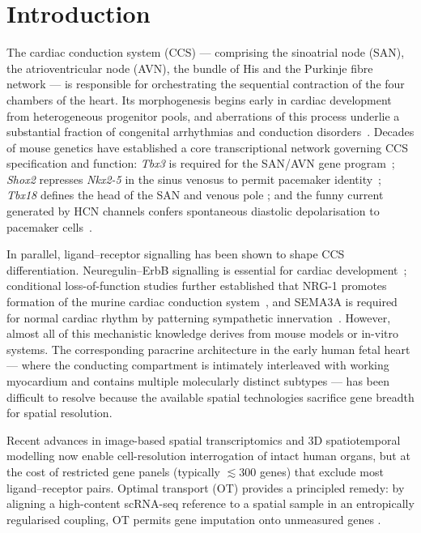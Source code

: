 \documentclass[11pt,a4paper]{article}
\begin{document}
\section{Introduction}

The cardiac conduction system (CCS) --- comprising the sinoatrial node
(SAN), the atrioventricular node (AVN), the bundle of His and the
Purkinje fibre network --- is responsible for orchestrating the
sequential contraction of the four chambers of the heart. Its
morphogenesis begins early in cardiac development from heterogeneous
progenitor pools, and aberrations of this process underlie a substantial
fraction of congenital arrhythmias and conduction
disorders~\citep{vanweerd2016ccsreview,park2017ccs}. Decades of mouse
genetics have established a core transcriptional network governing CCS
specification and function: \emph{Tbx3} is required for the SAN/AVN gene
program~\citep{hoogaars2007tbx3}; \emph{Shox2} represses
\emph{Nkx2-5} in the sinus venosus to permit pacemaker
identity~\citep{espinozalewis2009shox2,blaschke2007shox2}; \emph{Tbx18}
defines the head of the SAN and venous pole
\citep{christoffels2006tbx18,wiese2009tbx18tbx3}; and the funny current
generated by HCN channels confers spontaneous diastolic depolarisation
to pacemaker cells~\citep{difrancesco2010funny}.

In parallel, ligand--receptor signalling has been shown to shape CCS
differentiation. Neuregulin--ErbB signalling is essential for cardiac
development~\citep{lee1995erbb2,meyer1995neuregulin}; conditional
loss-of-function studies further established that NRG-1 promotes
formation of the murine cardiac conduction
system~\citep{rentschler2002nrg1ccs}, and SEMA3A is required for normal
cardiac rhythm by patterning sympathetic
innervation~\citep{ieda2007sema3a}. However, almost all of this
mechanistic knowledge derives from mouse models or in-vitro systems.
The corresponding paracrine architecture in the early human fetal heart
--- where the conducting compartment is intimately interleaved with
working myocardium and contains multiple molecularly distinct subtypes
--- has been difficult to resolve because the available spatial
technologies sacrifice gene breadth for spatial resolution.

Recent advances in image-based spatial transcriptomics
\citep{chen2015merfish,moffitt2018merfish} and 3D spatiotemporal modelling
\citep{qiu2024spateo} now enable cell-resolution interrogation of intact
human organs, but at the cost of restricted gene panels (typically
$\lesssim$300 genes) that exclude most ligand--receptor pairs. Optimal
transport (OT) provides a principled remedy: by aligning a high-content
scRNA-seq reference to a spatial sample in an entropically regularised
coupling, OT permits gene imputation onto unmeasured genes
\citep{schiebinger2019wot,klein2025moscot}.
\end{document}
